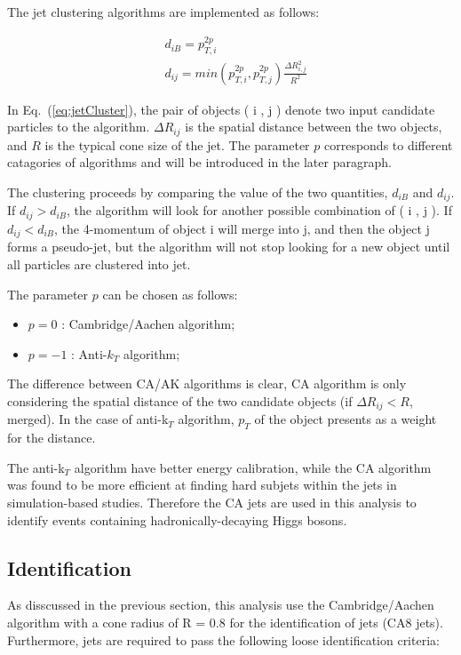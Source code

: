 The jet clustering algorithms are implemented as follows:

\begin{align}
  \label{eq:jetCluster}
  &d_{iB}=p_{T,i}^{2p}\nonumber \\
  &d_{ij}=min(p_{T,i}^{2p}, p_{T,j}^{2p})\frac{\Delta R_{i,j}^{2}}{R^{2}}
\end{align}

In Eq.~(\ref{eq:jetCluster}), the pair of objects ( i , j ) denote two input candidate particles to the algorithm. $\Delta R_{ij}$ is the spatial distance between the two objects, and $R$ is the typical cone size of the jet. The parameter $p$ corresponds to different catagories of algorithms and will be introduced in the later paragraph.

The clustering proceeds by comparing the value of the two quantities, $d_{iB}$ and $d_{ij}$. If $d_{ij} > d_{iB}$, the algorithm will look for another possible combination of ( i , j ).  If $d_{ij} < d_{iB}$, the 4-momentum of object i will merge into j, and then the object j forms a pseudo-jet, but the algorithm will not stop looking for a new object until all particles are clustered into jet.

The parameter $p$ can be chosen as follows:

\begin{itemize}
\item $p = 0$ : Cambridge/Aachen algorithm;
\item $p = -1$ : Anti-$k_{T}$ algorithm;
\end{itemize}

The difference between CA/AK algorithms is clear, CA algorithm is only considering the spatial distance of the two candidate objects (if $\Delta R_{ij} < R$, merged). In the case of anti-k$_{T}$ algorithm, $p_{T}$ of the object presents as a weight for the distance.

The anti-k$_{T}$ algorithm have better energy calibration, while the CA algorithm was found to be more efficient at finding hard subjets within the jets in simulation-based studies\cite{CAalgo3}. Therefore the CA jets are used in this analysis to identify events containing hadronically-decaying Higgs bosons.

\subsection*{Identification}
As disscussed in the previous section, this analysis use the Cambridge/Aachen algorithm with a cone radius of R = 0.8 for the identification of jets (CA8 jets). Furthermore, jets are required to pass the following loose identification criteria\cite{JetID,JetID2}:\\

